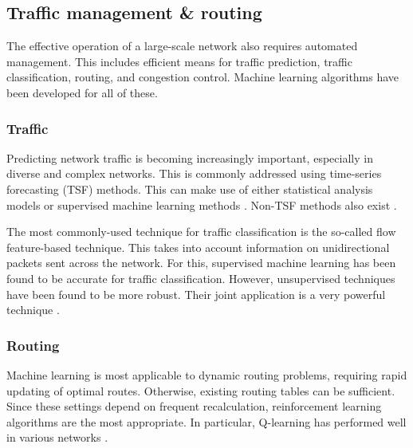 \documentclass[twocolumn, aps, rmp, amsmath, amssymb, nofootinbib, superscriptaddress, longbibliography, floatfix, table-of-contents, eqsecnum]{revtex4}
\begin{document}
\subsection{Traffic management \& routing }

The effective operation of a large-scale network also requires automated management. This includes efficient means for traffic prediction, traffic classification, routing, and congestion control. Machine learning algorithms have been developed for all of these.

\subsubsection{Traffic}

Predicting network traffic is becoming increasingly important, especially in diverse and complex networks. This is commonly addressed using time-series forecasting (TSF) methods. This can make use of either statistical analysis models or supervised machine learning methods \cite{bib:bermolen2009support, bib:chabaa2010identification, bib:cortez2006internet}. Non-TSF methods also exist \cite{bib:chen2016predicting, bib:li2016inter}.

The most commonly-used technique for traffic classification is the so-called flow feature-based technique. This takes into account information on unidirectional packets sent across the network. For this, supervised machine learning has been found to be accurate for traffic classification. However, unsupervised techniques have been found to be more robust. Their joint application is a very powerful technique \cite{bib:erman2007offline, bib:zhang2015robust}.

\subsubsection{Routing}

Machine learning is most applicable to dynamic routing problems, requiring rapid updating of optimal routes. Otherwise, existing routing tables can be sufficient. Since these settings depend on frequent recalculation, reinforcement learning algorithms are the most appropriate. In particular, Q-learning has performed well in various networks \cite{bib:wang2006adaptive, bib:forster2007froms, arroyo2007q}.
\end{document}
